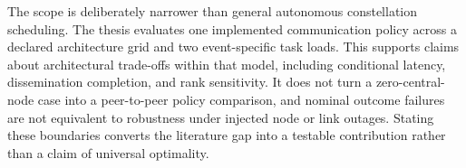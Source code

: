 The scope is deliberately narrower than general autonomous constellation scheduling. The thesis evaluates one implemented communication policy across a declared architecture grid and two event-specific task loads. This supports claims about architectural trade-offs within that model, including conditional latency, dissemination completion, and rank sensitivity. It does not turn a zero-central-node case into a peer-to-peer policy comparison, and nominal outcome failures are not equivalent to robustness under injected node or link outages. Stating these boundaries converts the literature gap into a testable contribution rather than a claim of universal optimality.
